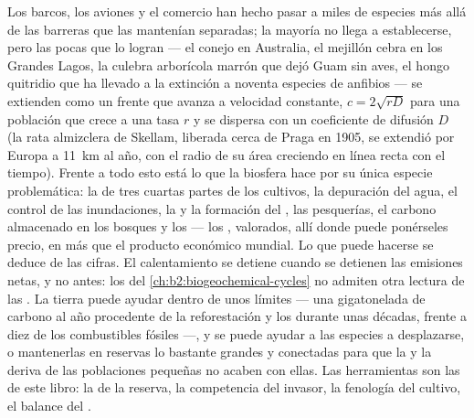 \begin{proposition}\label{prop:b2:global-change:invasion}
Los barcos, los aviones y el comercio han hecho pasar a miles de especies
más allá de las barreras que las mantenían separadas; la mayoría no llega
a establecerse, pero las pocas que lo logran --- el conejo en Australia, el
mejillón cebra en los Grandes Lagos, la culebra arborícola marrón que dejó
Guam sin aves, el hongo quitridio que ha llevado a la extinción a noventa
especies de anfibios --- se extienden como un frente que avanza a
velocidad constante, $c =
2\sqrt{rD}$ para una población que crece a una tasa $r$ y se dispersa con
un coeficiente de difusión $D$ (la rata almizclera de Skellam, liberada
cerca de Praga en 1905, se extendió por Europa a \qty{11}{km} al año, con
el radio de su área creciendo en línea recta con el tiempo). Frente a todo
esto está lo que la biosfera hace por su única especie problemática: la
 de tres cuartas partes de los cultivos, la depuración del
agua, el control de las inundaciones, la  y la
formación del , las pesquerías, el carbono almacenado en los bosques
y los  --- los \emph{}, valorados, allí donde
puede ponérseles precio, en más que el producto económico mundial. Lo que
puede hacerse se deduce de las cifras. El calentamiento se detiene cuando
se detienen las emisiones netas, y no antes: los  del
\cref{ch:b2:biogeochemical-cycles} no admiten otra lectura de las
\emph{}. La tierra puede ayudar dentro de unos
límites --- una gigatonelada de carbono al año procedente de la
reforestación y los  durante unas décadas, frente a diez de los
combustibles fósiles ---, y se puede ayudar a las especies a desplazarse,
o mantenerlas en reservas lo bastante grandes y conectadas para que la
 y la deriva de las poblaciones pequeñas no acaben
con ellas. Las herramientas son las de este libro: la  de la reserva, la competencia del invasor, la fenología del
cultivo, el balance del .
\end{proposition}

